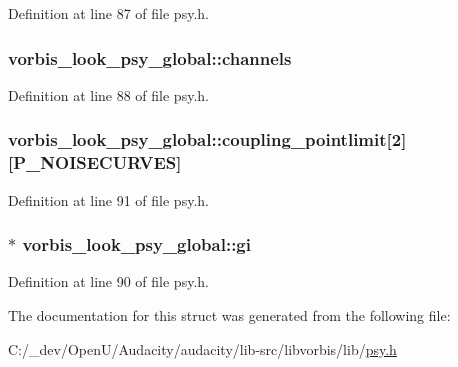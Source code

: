 Definition at line 87 of file psy.\+h.

\subsubsection[{\texorpdfstring{channels}{channels}}]{ vorbis\+\_\+look\+\_\+psy\+\_\+global\+::channels}\hypertarget{structvorbis__look__psy__global_ac86c7cc0a9c62a5271dd309e3607c9c0}{}\label{structvorbis__look__psy__global_ac86c7cc0a9c62a5271dd309e3607c9c0}


Definition at line 88 of file psy.\+h.

\subsubsection[{\texorpdfstring{coupling\+\_\+pointlimit}{coupling_pointlimit}}]{ vorbis\+\_\+look\+\_\+psy\+\_\+global\+::coupling\+\_\+pointlimit\mbox{[}2\mbox{]}\mbox{[}{\bf P\+\_\+\+N\+O\+I\+S\+E\+C\+U\+R\+V\+ES}\mbox{]}}\hypertarget{structvorbis__look__psy__global_a71b674604d210e99d9d007f90d5e8ea6}{}\label{structvorbis__look__psy__global_a71b674604d210e99d9d007f90d5e8ea6}


Definition at line 91 of file psy.\+h.

\subsubsection[{\texorpdfstring{gi}{gi}}]{$\ast$ vorbis\+\_\+look\+\_\+psy\+\_\+global\+::gi}\hypertarget{structvorbis__look__psy__global_a03368bba0e885407073c7cadb7ebd45e}{}\label{structvorbis__look__psy__global_a03368bba0e885407073c7cadb7ebd45e}


Definition at line 90 of file psy.\+h.



The documentation for this struct was generated from the following file\+:\begin{DoxyCompactItemize}
\item 
C\+:/\+\_\+dev/\+Open\+U/\+Audacity/audacity/lib-\/src/libvorbis/lib/\hyperlink{psy_8h}{psy.\+h}\end{DoxyCompactItemize}
